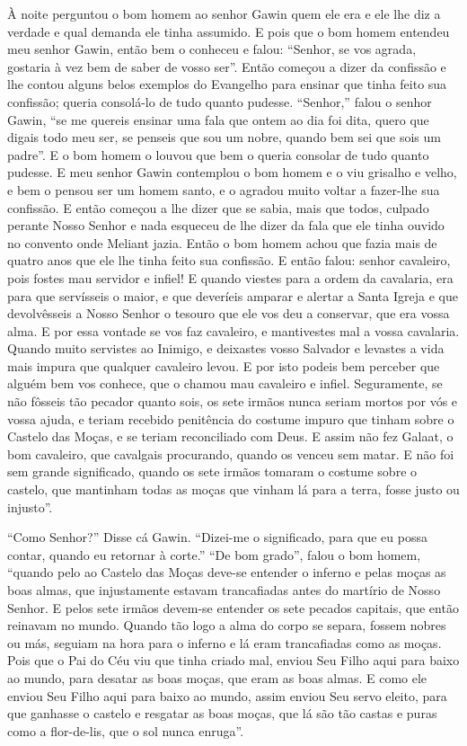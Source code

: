 À noite perguntou o bom homem ao senhor Gawin quem ele era e ele lhe diz a
verdade e qual demanda ele tinha assumido. E pois que o bom homem entendeu meu
senhor Gawin,  então bem o conheceu e falou: “Senhor, se vos agrada,
gostaria à vez bem de saber de vosso ser”. Então começou a dizer da confissão e
lhe contou alguns belos exemplos do Evangelho para ensinar que tinha feito sua
confissão; queria consolá-lo de tudo quanto pudesse. “Senhor,” falou o senhor
Gawin, ``se me quereis ensinar uma fala que ontem ao dia foi dita, quero que
digais todo meu ser, se penseis que sou um nobre, quando bem sei que sois um
padre”.  E o bom homem o louvou que bem o queria consolar de tudo quanto
pudesse. E meu senhor Gawin  contemplou o bom homem e o viu grisalho e
velho, e bem o pensou ser um homem santo, e o agradou muito voltar a fazer-lhe
sua confissão. E então começou a lhe dizer que se sabia, mais que todos, culpado
perante Nosso Senhor e nada esqueceu de lhe dizer da fala que ele tinha ouvido
no convento onde Meliant jazia. Então o bom homem achou que fazia mais de
quatro anos que ele lhe tinha feito sua confissão. E então falou: senhor
cavaleiro, pois fostes mau servidor e infiel! E quando viestes para a ordem da
cavalaria, era para que servísseis o maior, e que deveríeis amparar e alertar a
Santa Igreja e que devolvêsseis a Nosso Senhor o tesouro que ele vos deu a
conservar, que era vossa alma. E por essa vontade se vos faz cavaleiro, e
mantivestes mal a vossa cavalaria. Quando muito servistes ao Inimigo, e
deixastes vosso Salvador e levastes a vida mais impura que qualquer cavaleiro
levou. E por isto podeis bem perceber que alguém bem vos conhece, que o chamou
mau cavaleiro e infiel. Seguramente, se não fôsseis tão pecador quanto sois, os
sete irmãos nunca seriam mortos por vós e vossa ajuda, e teriam recebido
penitência do costume impuro que tinham sobre o Castelo das Moças, e se teriam
reconciliado com Deus. E assim não fez Galaat, o bom cavaleiro, que cavalgais
procurando, quando os venceu sem matar. E não foi sem grande significado,
quando os sete irmãos tomaram o costume sobre o castelo, que mantinham todas as
moças que vinham lá para a terra, fosse justo ou injusto”.  

“Como Senhor?” Disse cá Gawin. ``Dizei-me o significado, para que eu possa contar,
quando eu retornar à corte.'' “De bom grado”, falou o bom homem, “quando pelo ao
Castelo das Moças deve-se entender o inferno e pelas moças as boas almas, que
injustamente estavam trancafiadas antes do martírio de Nosso Senhor. E pelos
sete irmãos devem-se entender os sete pecados capitais, que então reinavam no
mundo. Quando tão logo a alma do corpo se separa, fossem nobres ou más, seguiam
na hora para o inferno e lá eram trancafiadas como as moças. Pois que o Pai do
Céu viu que tinha criado mal, enviou Seu Filho aqui para baixo ao mundo, para
desatar as boas moças, que eram as boas almas. E como ele enviou Seu Filho aqui
para baixo ao mundo, assim enviou Seu servo eleito, para que ganhasse o castelo
e resgatar as boas moças, que lá são tão castas e puras como a flor-de-lis, que
o sol nunca enruga”. 

